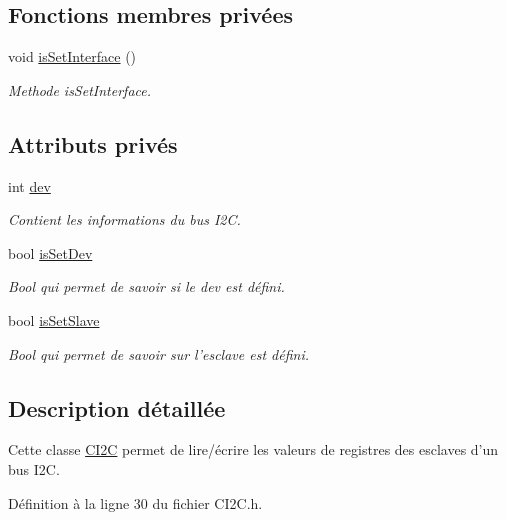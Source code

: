 \subsection*{Fonctions membres privées}
\begin{DoxyCompactItemize}
\item 
void \hyperlink{class_c_i2_c_a821adb4a309a1377fef4d1b8487a731e}{is\+Set\+Interface} ()
\begin{DoxyCompactList}\small\item\em Methode is\+Set\+Interface. \end{DoxyCompactList}\end{DoxyCompactItemize}
\subsection*{Attributs privés}
\begin{DoxyCompactItemize}
\item 
int \hyperlink{class_c_i2_c_ae2d4648eadc2acae86a49cecbf39ce56}{dev}
\begin{DoxyCompactList}\small\item\em Contient les informations du bus I2\+C. \end{DoxyCompactList}\item 
bool \hyperlink{class_c_i2_c_a892d111f995589334497f2b573ab436d}{is\+Set\+Dev}
\begin{DoxyCompactList}\small\item\em Bool qui permet de savoir si le dev est défini. \end{DoxyCompactList}\item 
bool \hyperlink{class_c_i2_c_a19200c12efe17b560256641cce4f5909}{is\+Set\+Slave}
\begin{DoxyCompactList}\small\item\em Bool qui permet de savoir sur l'esclave est défini. \end{DoxyCompactList}\end{DoxyCompactItemize}


\subsection{Description détaillée}
Cette classe \hyperlink{class_c_i2_c}{C\+I2\+C} permet de lire/écrire les valeurs de registres des esclaves d'un bus I2\+C. 

Définition à la ligne 30 du fichier C\+I2\+C.\+h.



